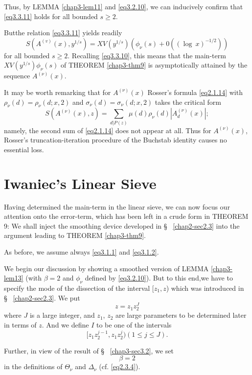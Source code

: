Thus, by LEMMA \ref{chap3-lem11} and \eqref{eq3.2.10}, we can
inducively confirm that 
\eqref{eq3.3.11} holds for all bounded $s \ge 2$. 

But\pageoriginale the relation \eqref{eq3.3.11} yields readily
$$
S(A^{(v)}(x), y^{1/s}) = XV(y^{1/s}) (\phi_{\nu}(s) + 0 ((\log ~ x)^{-1/2}))
$$
for all bounded $s \geq 2$. Recalling \eqref{eq3.3.10}, this means that the
main-term $XV(y^{1/s}) \phi_{\nu}(s)$ of THEOREM \ref{chap3-thm9} is
asymptotically attained by the sequence $A^{(\nu)}(x)$. 

It may  be worth remarking that for $A^{(\nu)}(x)$ Rosser's formula
\eqref{eq2.1.14} with $\rho_{\nu}(d) = \rho_\nu (d; x, 2)$ and $\sigma_\nu (d)
= \sigma_\nu (d; x, 2)$ takes the critical form 
$$
S(A^{(\nu)}(x), z) = \sum_{d | P (z)} \mu (d) \rho_\nu (d) |A^{(\nu)}_d (x) | ;
$$
namely, the second sum of \eqref{eq2.1.14} does not appear at all. Thus for
$A^{(\nu)}(x)$, Rosser's truncation-iteration procedure of the
Buchstab identity causes no essential loss. 

\section{Iwaniec's Linear Sieve}\label{chap3-sec3.4}%

Having determined the main-term in the linear sieve, we can now focus
our attention onto the error-term, which has been left in a crude form
in THEOREM 9: We shall inject the smoothing device developed in \S~
\ref{chap2-sec2.3} into the argument leading to THEOREM
\ref{chap3-thm9}. 	 

As before, we assume always \eqref{eq3.1.1} and \eqref{eq3.1.2}.

We begin our discussion by showing a smoothed version of LEMMA
\ref{chap3-lem13} 
(with $\beta = 2$ and $\phi_\nu$ defined by \eqref{eq3.2.10}). But to this
end,\pageoriginale we have to specify the mode of the dissection of the interval
[$z_1, z$) which was introduced in \S~ \ref{chap2-sec2.3}. We put 
$$
z = z_1z_2^J
$$
where $J$ is a large integer, and $z_1$, $z_2$ are large parameters to
be determined later in terms of $z$. And we define $I$ to be one of
the intervals 
\begin{equation*}
[z_1z^{j-1}_2, z_1 z_2^j)(1 \leq j \leq J). \tag{3.4.1}\label{eq3.4.1}
\end{equation*}

Further, in view of the result of \S~ \ref{chap3-sec3.2}, we set 
$$
\beta = 2
$$
in the definitions of $\Theta_\nu$ and $\Delta_\nu$ (cf. \eqref{eq2.3.4}).


